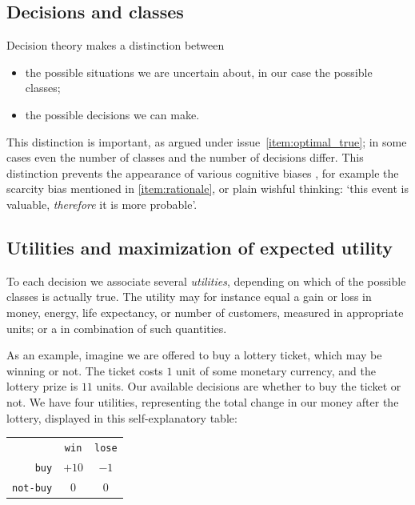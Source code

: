 \documentclass[\ifafour a4paper,12pt,\else a5paper,10pt,\fi%
onecolumn,oneside,article,%
british%
]{memoir}
\theoremstyle{remark}
\theoremstyle{innote}
\renewcommand*{\|}[1][]{\nonscript\:#1\vert\nonscript\:\mathopen{}}
\begin{document}
\subsection{Decisions and classes}
\label{sec:dt_dec_classes}

Decision theory makes a distinction between
\begin{itemize}
\item the possible situations we are uncertain about, in our case the possible classes;
\item the possible decisions we can make.
\end{itemize}
This distinction is important, as argued under issue~\ref{item:optimal_true}; in some cases even the number of classes and the number of decisions differ. This distinction prevents the appearance of various cognitive biases \autocites{kahnemanetal1982_r2008,gilovichetal2002_r2009,kahneman2011}, for example the scarcity bias mentioned in \ref{item:rationale}, or plain wishful thinking: \enquote*{this event is valuable, \emph{therefore} it is more probable}.

\subsection{Utilities and maximization of expected utility}
\label{sec:dt_utilities}

To each decision we associate several \emph{utilities}, depending on which of the possible classes is actually true. The utility may for instance equal a gain or loss in money, energy, life expectancy, or number of customers, measured in appropriate units; or a in combination of such quantities.

As an example, imagine we are offered to buy a lottery ticket, which may be winning or not. The ticket costs $1$ unit of some monetary currency, and the lottery prize is $11$ units. Our available decisions are whether to buy the ticket or not. We have four utilities, representing the total change in our money after the lottery, displayed in this self-explanatory table:
\begin{center}
  \begin{tabular}{rcc}
    &\texttt{\small win}&
    \texttt{\small lose}
    \\[0.5\jot]
    \texttt{\small buy}&$+10$&$-1$\\
    \texttt{\small not-buy}&$0$&$0$
  \end{tabular}
\end{center}
\end{document}
